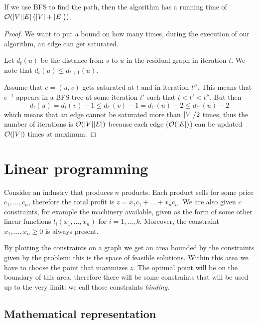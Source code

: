 \documentclass[12pt]{extarticle}
\begin{document}
\begin{theorem}
    If we use BFS to find the path, then the algorithm has a running time of $\mathcal{O}(\abs{V} \abs{E} \left( \abs{V} + \abs{E} \right))$.
\end{theorem}

\begin{proof}
    We want to put a bound on how many times, during the execution of our algorithm, an edge can get saturated.

    Let $d_t(u)$ be the distance from $s$ to $u$ in the residual graph in iteration $t$.
    We note that $d_t(u) \leq d_{t+1}(u)$.

    Assume that $e = (u, v)$ gets saturated at $t$ and in iteration $t''$.
    This means that $e^{-1}$ appears in a BFS tree at some iteration $t'$ such that $t < t' < t''$.
    But then
    \begin{equation}
        d_t(u) = d_t(v)-1 \leq d_{t'}(v)-1 = d_{t'}(u)-2 \leq d_{t''}(u)-2
    \end{equation}
    which means that an edge cannot be saturated more than $\abs{V}/2$ times,
    thus the number of iterations is $\mathcal{O}(\abs{V}\abs{E})$ because each edge ($\mathcal{O}(\abs{E})$) can be updated $\mathcal{O}(\abs{V})$ times at maximum.
\end{proof}

\section{Linear programming}

Consider an industry that produces $n$ products.
Each product sells for some price $c_1, \ldots, c_n$, therefore the total profit is $z = x_1 c_1 + \dots + x_n c_n$.
We are also given $c$ constraints, for example the machinery available, given as the form of some other linear functions $l_i(x_1, \ldots, x_n)$ for $i = 1, \ldots, k$.
Moreover, the constraint $x_1, \ldots, x_n \geq 0$ is always present.

By plotting the constraints on a graph we get an area bounded by the constraints given by the problem: this is the space of feasible solutions.
Within this area we have to choose the point that maximizes $z$.
The optimal point will be on the boundary of this area, therefore there will be some constraints that will be used up to the very limit: we call those  constraints \textit{binding}.

\subsection{Mathematical representation}
\end{document}
